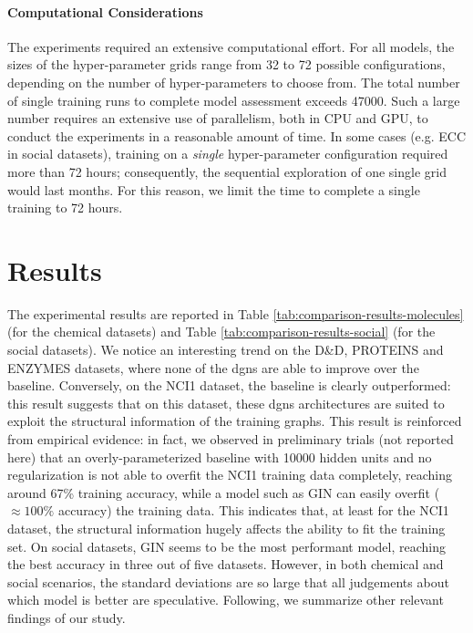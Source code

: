 \paragraph{Computational Considerations}
The experiments required an extensive computational effort. For all models, the sizes of the hyper-parameter grids range from 32 to 72 possible configurations, depending on the number of hyper-parameters to choose from. The total number of single training runs to complete model assessment exceeds 47000. Such a large number requires an extensive use of parallelism, both in CPU and GPU, to conduct the experiments in a reasonable amount of time. In some cases (e.g. ECC in social datasets), training on a \emph{single} hyper-parameter configuration required more than 72 hours; consequently, the sequential exploration of one single grid would last months. For this reason, we limit the time to complete a single training to 72 hours.

\section{Results}
The experimental results are reported in Table \ref{tab:comparison-results-molecules} (for the chemical datasets) and Table \ref{tab:comparison-results-social} (for the social datasets). We notice an interesting trend on the D\&D, PROTEINS and ENZYMES datasets, where none of the \glspl{dgn} are able to improve over the baseline. Conversely, on the NCI1 dataset, the baseline is clearly outperformed: this result suggests that on this dataset, these \glspl{dgn} architectures are suited to exploit the structural information of the training graphs. This result is reinforced from empirical evidence: in fact, we observed in preliminary trials (not reported here) that an overly-parameterized baseline with 10000 hidden units and no regularization is not able to overfit the NCI1 training data completely, reaching around 67\% training accuracy, while a model such as GIN can easily overfit ($\approx 100\%$ accuracy) the training data. This indicates that, at least for the NCI1 dataset, the structural information hugely affects the ability to fit the training set. On social datasets, GIN seems to be the most performant model, reaching the best accuracy in three out of five datasets. However, in both chemical and social scenarios, the standard deviations are so large that all judgements about which model is better are speculative. Following, we summarize other relevant findings of our study.



